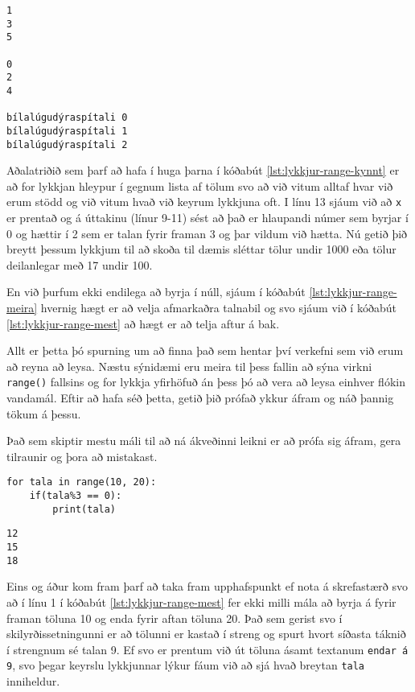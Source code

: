 \lstset{style=uttak}
\begin{lstlisting}
1
3
5

0
2
4

bílalúgudýraspítali 0
bílalúgudýraspítali 1
bílalúgudýraspítali 2
\end{lstlisting}

Aðalatriðið sem þarf að hafa í huga þarna í kóðabút \ref{lst:lykkjur-range-kynnt} er að for lykkjan hleypur í gegnum lista af tölum svo að við vitum alltaf hvar við erum stödd og við vitum hvað við keyrum lykkjuna oft.
I línu 13 sjáum við að \texttt{x} er prentað og á úttakinu (línur 9-11) sést að það er hlaupandi númer sem byrjar í 0 og hættir í 2 sem er talan fyrir framan 3 og þar vildum við hætta.
Nú getið þið breytt þessum lykkjum til að skoða til dæmis sléttar tölur undir 1000 eða tölur deilanlegar með 17 undir 100.

En við þurfum ekki endilega að byrja í núll, sjáum í kóðabút \ref{lst:lykkjur-range-meira} hvernig hægt er að velja afmarkaðra talnabil og svo sjáum við í kóðabút \ref{lst:lykkjur-range-mest} að hægt er að telja aftur á bak.

Allt er þetta þó spurning um að finna það sem hentar því verkefni sem við erum að reyna að leysa.
Næstu sýnidæmi eru meira til þess fallin að sýna virkni \texttt{range()} fallsins og for lykkja yfirhöfuð án þess þó að vera að leysa einhver flókin vandamál.
Eftir að hafa séð þetta, getið þið prófað ykkur áfram og náð þannig tökum á þessu.

Það sem skiptir mestu máli til að ná ákveðinni leikni er að prófa sig áfram, gera tilraunir og þora að mistakast.

\lstset{style=venjulegt}
\begin{lstlisting}[caption=for lykkja og range() fallið með skilyrðissetningu, label=lst:lykkjur-range-meira]
for tala in range(10, 20):
	if(tala%3 == 0):
		print(tala)
\end{lstlisting}

\lstset{style=uttak}
\begin{lstlisting}
12
15
18
\end{lstlisting}

Eins og áður kom fram þarf að taka fram upphafspunkt ef nota á skrefastærð svo að í línu 1 í kóðabút \ref{lst:lykkjur-range-mest} fer ekki milli mála að byrja á fyrir framan töluna 10 og enda fyrir aftan töluna 20.
Það sem gerist svo í skilyrðissetningunni er að tölunni er kastað í streng og spurt hvort síðasta táknið í strengnum sé talan 9.
Ef svo er prentum við út töluna ásamt textanum \texttt{endar á 9}, svo þegar keyrslu lykkjunnar lýkur fáum við að sjá hvað breytan \texttt{tala} inniheldur.


